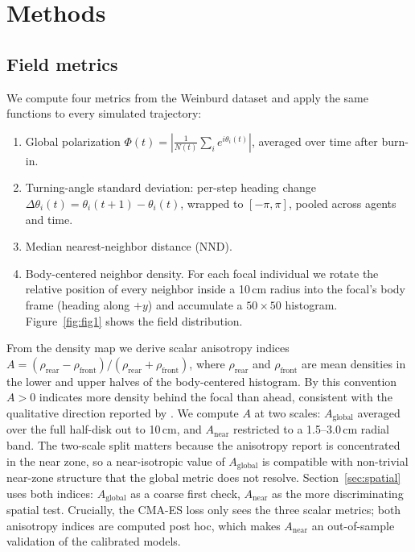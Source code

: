 \documentclass[11pt]{article}
\begin{document}
\section{Methods}
\label{sec:methods}

\subsection{Field metrics}

We compute four metrics from the Weinburd dataset and apply the same
functions to every simulated trajectory:

\begin{enumerate}
\item Global polarization $\Phi(t) = \left| \frac{1}{N(t)} \sum_i
  e^{i\theta_i(t)} \right|$, averaged over time after burn-in.
\item Turning-angle standard deviation: per-step heading change
  $\Delta\theta_i(t) = \theta_i(t+1) - \theta_i(t)$, wrapped to
  $[-\pi, \pi]$, pooled across agents and time.
\item Median nearest-neighbor distance (NND).
\item Body-centered neighbor density. For each focal individual we
  rotate the relative position of every neighbor inside a 10\,cm radius
  into the focal's body frame (heading along $+y$) and accumulate a
  $50 \times 50$ histogram. Figure~\ref{fig:fig1} shows the field
  distribution.
\end{enumerate}

From the density map we derive scalar anisotropy indices
$A = (\rho_\text{rear} - \rho_\text{front}) / (\rho_\text{rear} +
\rho_\text{front})$, where $\rho_\text{rear}$ and $\rho_\text{front}$ are
mean densities in the lower and upper halves of the body-centered
histogram. By this convention $A > 0$ indicates more density behind the
focal than ahead, consistent with the qualitative direction reported by
\citet{weinburd2024}. We compute $A$ at two scales: $A_\text{global}$
averaged over the full half-disk out to 10\,cm, and $A_\text{near}$
restricted to a 1.5--3.0\,cm radial band. The two-scale split matters
because the anisotropy \citet{weinburd2024} report is concentrated in the
near zone, so a near-isotropic value of $A_\text{global}$ is compatible
with non-trivial near-zone structure that the global metric does not
resolve. Section~\ref{sec:spatial} uses both indices: $A_\text{global}$
as a coarse first check, $A_\text{near}$ as the more discriminating
spatial test. Crucially, the CMA-ES loss only sees the three scalar
metrics; both anisotropy indices are computed post hoc, which makes
$A_\text{near}$ an out-of-sample validation of the calibrated models.
\end{document}
